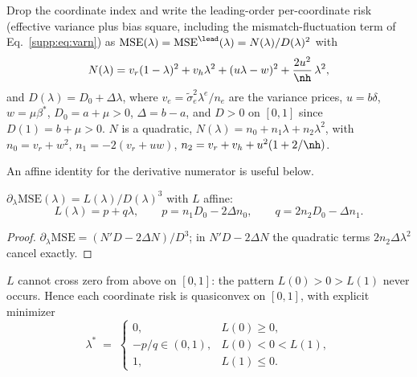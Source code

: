 Drop the coordinate index and write the leading-order per-coordinate risk (effective variance plus bias square, including the mismatch-fluctuation term of Eq.~\eqref{supp:eq:varn}) as $\mathrm{MSE}(\lambda) = \mathrm{MSE}^{\lead}(\lambda) = N(\lambda)/D(\lambda)^2$ with
\begin{equation}
N(\lambda) = v_r(1-\lambda)^2 + v_h\lambda^2 + (u\lambda - w)^2 + \frac{2u^2}{\nh}\,\lambda^2,
\end{equation}
and $D(\lambda) = D_0 + \Delta \lambda$, where $v_e = \tilde\sigma_e^2 \lambda^e / n_e$ are the variance prices, $u = b\delta$, $w = \mu\beta^*$, $D_0 = a + \mu > 0$, $\Delta = b - a$, and $D > 0$ on $[0,1]$ since $D(1) = b + \mu > 0$.
$N$ is a quadratic, $N(\lambda) = n_0 + n_1\lambda + n_2\lambda^2$, with $n_0 = v_r + w^2$, $n_1 = -2(v_r + uw)$, $n_2 = v_r + v_h + u^2(1 + 2/\nh)$.

An affine identity for the derivative numerator is useful below.
\begin{lemma}\label{supp:lem:affine}
$\partial_\lambda \mathrm{MSE}(\lambda) = L(\lambda)/D(\lambda)^3$ with $L$ affine:
\begin{equation}
L(\lambda) = p + q\lambda,
\qquad
p = n_1 D_0 - 2\Delta n_0,
\qquad
q = 2 n_2 D_0 - \Delta n_1 .
\end{equation}
\end{lemma}

\begin{proof}
$\partial_\lambda \mathrm{MSE} = (N' D - 2\Delta N)/D^3$; in $N'D - 2\Delta N$ the quadratic terms $2 n_2 \Delta \lambda^2$ cancel exactly.
\end{proof}

\begin{proposition}\label{supp:prop:nomax}
$L$ cannot cross zero from above on $[0,1]$: the pattern $L(0) > 0 > L(1)$ never occurs.
Hence each coordinate risk is quasiconvex on $[0,1]$, with explicit minimizer
\begin{equation}
\lambda^* \;=\; \begin{cases}
0, & L(0) \ge 0,\\[2pt]
-p/q \in (0,1), & L(0) < 0 < L(1),\\[2pt]
1, & L(1) \le 0 .
\end{cases}
\label{supp:eq:lamstar}
\end{equation}
\end{proposition}

